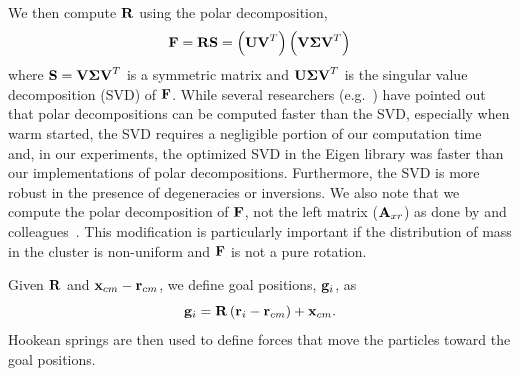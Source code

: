 \documentclass[review]{acmsiggraph}
\begin{document}
We then compute $\mathit{\mathbf{R}}$ using the polar decomposition,
\begin{equation}
\label{eq:decomp}
\mathit{\mathbf{F}} = \mathit{\mathbf{R}}\mathit{\mathbf{S}} = \left(\mathit{\mathbf{UV}}^T\right)\left(\mathit{\mathbf{V\Sigma V}}^T\right)
\end{equation}
where $\mathit{\mathbf{S}}=\mathit{\mathbf{V\Sigma V}}^T$ is a symmetric matrix and $\mathit{\mathbf{U\Sigma V}}^T$ is the singular value decomposition (SVD) of $\mathit{\mathbf{F}}$.
While several researchers (e.g.~\cite{Rivers:2007:FFL}) have pointed out that polar decompositions can be computed faster than the SVD,
especially when warm started, the SVD requires a negligible portion of our computation time and, in our experiments, 
the optimized SVD in the Eigen library was faster than our implementations of polar decompositions.  Furthermore, the SVD is more robust in
the presence of degeneracies or inversions.
We also note that we compute the polar decomposition of $\mathit{\mathbf{F}}$, not
the left matrix ($\mathit{\mathbf{A}}_{xr}$)
as done by \Mueller and colleagues~.  This modification
is particularly important if the distribution of mass in the cluster is non-uniform and $\mathit{\mathbf{F}}$ is not a pure rotation.

Given $\mathit{\mathbf{R}}$ and $\mathit{\mathbf{x}}_{cm}-\mathit{\mathbf{r}}_{cm}$, we define goal positions, $\mathit{\mathbf{g}}_i$, as
\begin{equation}
\mathit{\mathbf{g}}_i = \mathit{\mathbf{R}}\left(\mathit{\mathbf{r}}_i-\mathit{\mathbf{r}}_{cm}\right)+\mathit{\mathbf{x}}_{cm}.
\end{equation}
Hookean springs are then used to define forces that move the particles toward the goal positions.
\end{document}
